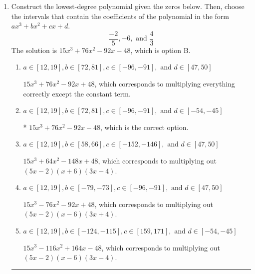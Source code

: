 \documentclass{extbook}[14pt]
\newcommand{\litem}[1]{\item #1

\rule{\textwidth}{0.4pt}}
\begin{document}
\begin{enumerate}\litem{
Construct the lowest-degree polynomial given the zeros below. Then, choose the intervals that contain the coefficients of the polynomial in the form $ax^3+bx^2+cx+d$.
\[ \frac{-2}{5}, -6, \text{ and } \frac{4}{3} \]The solution is \( 15x^{3} +76 x^{2} -92 x -48 \), which is option B.\begin{enumerate}[label=\Alph*.]
\item \( a \in [12, 19], b \in [72, 81], c \in [-96, -91], \text{ and } d \in [47, 50] \)

$15x^{3} +76 x^{2} -92 x + 48$, which corresponds to multiplying everything correctly except the constant term.
\item \( a \in [12, 19], b \in [72, 81], c \in [-96, -91], \text{ and } d \in [-54, -45] \)

* $15x^{3} +76 x^{2} -92 x -48$, which is the correct option.
\item \( a \in [12, 19], b \in [58, 66], c \in [-152, -146], \text{ and } d \in [47, 50] \)

$15x^{3} +64 x^{2} -148 x + 48$, which corresponds to multiplying out $(5x -2)(x + 6)(3x -4)$.
\item \( a \in [12, 19], b \in [-79, -73], c \in [-96, -91], \text{ and } d \in [47, 50] \)

$15x^{3} -76 x^{2} -92 x + 48$, which corresponds to multiplying out $(5x -2)(x -6)(3x + 4)$.
\item \( a \in [12, 19], b \in [-124, -115], c \in [159, 171], \text{ and } d \in [-54, -45] \)

$15x^{3} -116 x^{2} +164 x -48$, which corresponds to multiplying out $(5x -2)(x -6)(3x -4)$.
\end{enumerate}

}
\end{enumerate}
\end{document}
